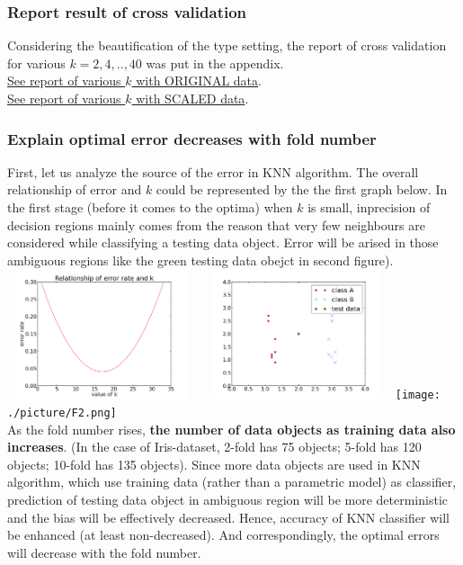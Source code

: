 \documentclass[11pt,a4paper]{article}
\newcommand{\htab}{\hspace*{0.63cm}}
\begin{document}
\subsubsection{Report result of cross validation}
Considering the beautification of the type setting, the report of cross validation for various $k = 2,4,..,40$ was put in the appendix. \\ 
\htab \hyperlink{kResultUNSCALED}{See report of various $k$ with ORIGINAL data}. \\
\htab \hyperlink{kResultSCALED}{See report of various $k$ with SCALED data}.\\
\newpage
\subsubsection{Explain optimal error decreases with fold number}
\htab First, let us analyze the source of the error in KNN algorithm. The overall relationship of error and $k$ could be represented by the the first graph below. In the first stage (before it comes to the optima) when $k$ is small, inprecision of decision regions mainly comes from the reason that very few neighbours are considered while classifying a testing data object. Error will be arised in those ambiguous regions like the green testing data obejct in second figure). \\
\includegraphics[width=2.2in,height=1.5in]{./picture/F0.png}
\includegraphics[width=2.2in,height=1.5in]{./picture/F1.png}
\texttt{[image: ./picture/F2.png]}\\
\htab As the fold number rises, \textbf{the number of data objects as training data also increases}. (In the case of Iris-dataset, 2-fold has 75 objects; 5-fold has 120 objects; 10-fold has 135 objects). Since more data objects are used in KNN algorithm, which use training data (rather than a parametric model) as classifier, prediction of testing data object in ambiguous region will be more deterministic and the bias will be effectively decreased. Hence, accuracy of KNN classifier will be enhanced (at least non-decreased). And correspondingly, the optimal errors will decrease with the fold number.
\end{document}

